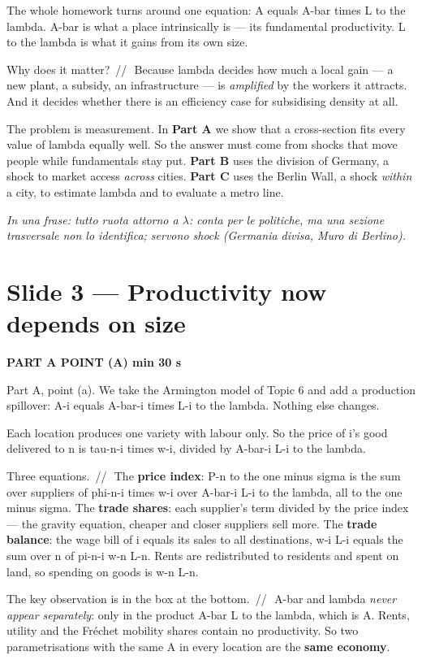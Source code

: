\documentclass[11pt,a4paper]{article}
\newcommand{\slide}[3]{\Needspace{14\baselineskip}\section{#1}\textcolor{unicared}{\small\bfseries\MakeUppercase{#3}\quad\textperiodcentered\quad #2}\par}
\newcommand{\idea}[1]{\par{\small\itshape\color{unicablue}In una frase: #1}\par}
\newcommand{\pause}{\textcolor{unicared}{\,/\!/\,}}
\begin{document}
\begin{say}
The whole homework turns around one equation: A equals A-bar times L to the lambda. A-bar is what a place intrinsically is --- its fundamental productivity. L to the lambda is what it gains from its own size.

Why does it matter? \pause\ Because lambda decides how much a local gain --- a new plant, a subsidy, an infrastructure --- is \emph{amplified} by the workers it attracts. And it decides whether there is an efficiency case for subsidising density at all.

The problem is measurement. In \textbf{Part A} we show that a cross-section fits every value of lambda equally well. So the answer must come from shocks that move people while fundamentals stay put. \textbf{Part B} uses the division of Germany, a shock to market access \emph{across} cities. \textbf{Part C} uses the Berlin Wall, a shock \emph{within} a city, to estimate lambda and to evaluate a metro line.
\end{say}

\idea{tutto ruota attorno a $\lambda$: conta per le politiche, ma una sezione trasversale non lo identifica; servono shock (Germania divisa, Muro di Berlino).}

\slide{Slide 3 --- Productivity now depends on size}{1 min 30 s}{Part A \textperiodcentered{} point (a)}

\begin{say}
Part A, point (a). We take the Armington model of Topic 6 and add a production spillover: A-i equals A-bar-i times L-i to the lambda. Nothing else changes.

Each location produces one variety with labour only. So the price of i's good delivered to n is tau-n-i times w-i, divided by A-bar-i L-i to the lambda.

Three equations. \pause\ The \textbf{price index}: P-n to the one minus sigma is the sum over suppliers of phi-n-i times w-i over A-bar-i L-i to the lambda, all to the one minus sigma. The \textbf{trade shares}: each supplier's term divided by the price index --- the gravity equation, cheaper and closer suppliers sell more. The \textbf{trade balance}: the wage bill of i equals its sales to all destinations, w-i L-i equals the sum over n of pi-n-i w-n L-n. Rents are redistributed to residents and spent on land, so spending on goods is w-n L-n.

The key observation is in the box at the bottom. \pause\ A-bar and lambda \emph{never appear separately}: only in the product A-bar L to the lambda, which is A. Rents, utility and the Fréchet mobility shares contain no productivity. So two parametrisations with the same A in every location are the \textbf{same economy}.
\end{say}
\end{document}
